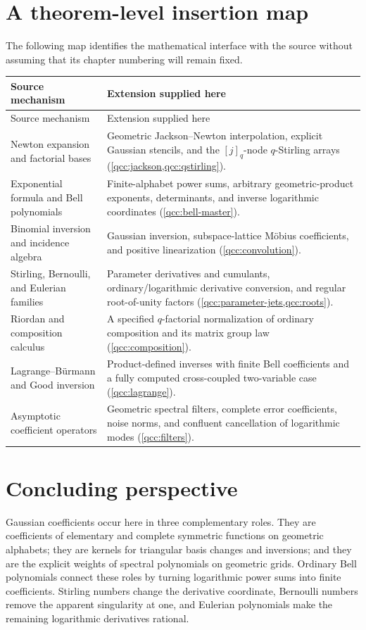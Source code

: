 \documentclass[11pt,a4paper,oneside,openany]{book}
\theoremstyle{definition}
\theoremstyle{remark}
\begin{document}
\section{A theorem-level insertion map}
The following map identifies the mathematical interface with the source without
assuming that its chapter numbering will remain fixed.
\begin{longtable}{@{}p{}p{}@{}}
\toprule
Source mechanism & Extension supplied here\\
\midrule
\endfirsthead
\toprule
Source mechanism & Extension supplied here\\
\midrule
\endhead
Newton expansion and factorial bases &
Geometric Jackson--Newton interpolation, explicit Gaussian stencils, and the
\([j]_q\)-node \(q\)-Stirling arrays
(\cref{qcc:jackson,qcc:qstirling}).\\[2mm]
Exponential formula and Bell polynomials &
Finite-alphabet power sums, arbitrary geometric-product exponents, determinants,
and inverse logarithmic coordinates (\cref{qcc:bell-master}).\\[2mm]
Binomial inversion and incidence algebra &
Gaussian inversion, subspace-lattice M\"obius coefficients, and positive
linearization (\cref{qcc:convolution}).\\[2mm]
Stirling, Bernoulli, and Eulerian families &
Parameter derivatives and cumulants, ordinary/logarithmic derivative conversion,
and regular root-of-unity factors
(\cref{qcc:parameter-jets,qcc:roots}).\\[2mm]
Riordan and composition calculus &
A specified \(q\)-factorial normalization of ordinary composition and its
matrix group law (\cref{qcc:composition}).\\[2mm]
Lagrange--B\"urmann and Good inversion &
Product-defined inverses with finite Bell coefficients and a fully computed
cross-coupled two-variable case (\cref{qcc:lagrange}).\\[2mm]
Asymptotic coefficient operators &
Geometric spectral filters, complete error coefficients, noise norms, and
confluent cancellation of logarithmic modes (\cref{qcc:filters}).\\
\bottomrule
\end{longtable}

\section{Concluding perspective}
Gaussian coefficients occur here in three complementary roles. They are
coefficients of elementary and complete symmetric functions on geometric
alphabets; they are kernels for triangular basis changes and inversions; and
they are the explicit weights of spectral polynomials on geometric grids.
Ordinary Bell polynomials connect these roles by turning logarithmic power sums
into finite coefficients. Stirling numbers change the derivative coordinate,
Bernoulli numbers remove the apparent singularity at one, and Eulerian
polynomials make the remaining logarithmic derivatives rational.
\end{document}
